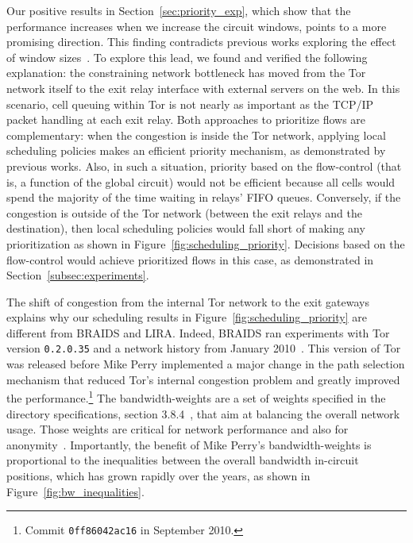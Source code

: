 Our positive results in Section~\ref{sec:priority_exp}, which show that the performance increases when we increase the circuit windows, points to a more promising direction.
This finding contradicts previous works exploring the effect of window sizes~\cite{archive-2009-mail, kiraly2008solving, dingledine2009performance}. 
To explore this lead, we found and verified the following explanation: the constraining network bottleneck has moved from the Tor network itself to the exit relay interface with external servers on the web.
In this scenario, cell queuing within Tor is not nearly as important as the TCP/IP packet handling at each exit relay.
Both approaches to prioritize flows are complementary: when the congestion is inside the Tor network, applying local scheduling policies makes an efficient priority mechanism, as demonstrated by previous works.
Also, in such a situation, priority based on the flow-control (that is, a function of the global circuit) would not be efficient because all cells would spend the majority of the time waiting in relays' FIFO queues.
Conversely, if the congestion is outside of the Tor network (between the exit relays and the destination), then local scheduling policies would fall short of making any prioritization as shown in Figure~\ref{fig:scheduling_priority}.
Decisions based on the flow-control would achieve prioritized flows in this case, as demonstrated in Section~\ref{subsec:experiments}.

The shift of congestion from the internal Tor network to the exit gateways explains why our scheduling results in Figure~\ref{fig:scheduling_priority} are different from BRAIDS and LIRA.
Indeed, BRAIDS ran experiments with Tor version \texttt{0.2.0.35} and a network history from January 2010~\cite{braids-repository}.
This version of Tor was released before Mike Perry implemented a major change in the path selection mechanism that reduced Tor's internal congestion problem and greatly improved the performance.\footnote{Commit \texttt{0ff86042ac16} in September 2010.}
The bandwidth-weights are a set of weights specified in the directory specifications, section 3.8.4~\cite{dirspec}, that aim at balancing the overall network usage.
Those weights are critical for network performance and also for anonymity~\cite{waterfilling-pets2017, wf_proposal}.
Importantly, the benefit of Mike Perry's bandwidth-weights is proportional to the inequalities between the overall bandwidth in-circuit positions, which has grown rapidly over the years, as shown in Figure~\ref{fig:bw_inequalities}.

